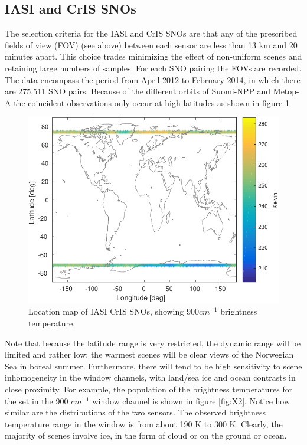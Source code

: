 \documentclass[11pt]{article}
\begin{document}
\subsection{IASI and CrIS SNOs}
\label{sec:orgheadline8}
The selection criteria for the IASI and CrIS SNOs are that any of the prescribed fields of view (FOV) (see above) between each sensor are less than 13 km and 20 minutes apart. This choice trades minimizing the effect of non-uniform scenes and retaining large numbers of samples.  For each SNO pairing the FOVs are recorded. The data encompass the period from April 2012 to February 2014, in which there are 275,511 SNO pairs. Because of the different orbits
of Suomi-NPP and Metop-A the coincident observations only occur at high latitudes as
shown in figure \ref{fig:X1}

\begin{figure}[htb]
\centering
\includegraphics[width=.6\linewidth]{./figs/IC_jplSNO_900wn_map.pdf}
\caption{\label{fig:orgparagraph3}
  Location map of IASI CrIS SNOs, showing $900 cm^{-1}$ brightness temperature.}
\label{fig:X1}
\end{figure}

Note that because the latitude range is very restricted, the dynamic range will be limited and rather low; the warmest scenes will be clear views of the Norwegian Sea in boreal summer.  Furthermore, there will tend to be high sensitivity to scene inhomogeneity in the window channels, with land/sea ice and ocean contrasts in close proximity. For example, the population of
the brightness temperatures for the set in the 900 \(cm^{-1}\) window channel is shown in figure \ref{fig:X2}. Notice how similar are the distributions of the two sensors.
The observed brightness temperature range in the window is from about 190 K to 300 K. Clearly,
the majority of scenes involve ice, in the form of cloud or on the ground or ocean.
\end{document}
